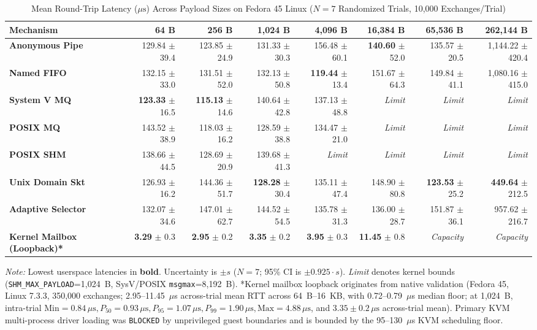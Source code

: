\begin{table}[!t]
\centering
\caption{Mean Round-Trip Latency ($\mu\text{s}$) Across Payload Sizes on Fedora 45 Linux ($N=7$ Randomized Trials, 10,000 Exchanges/Trial)}
\label{tab:benchmark_results}
\scriptsize
\renewcommand{\arraystretch}{0.92}
\begin{tabular}{lrrrrrrr}
\toprule
\textbf{Mechanism} & \textbf{64 B} & \textbf{256 B} & \textbf{1,024 B} & \textbf{4,096 B} & \textbf{16,384 B} & \textbf{65,536 B} & \textbf{262,144 B} \\
\midrule
\textbf{Anonymous Pipe} & 129.84 $\pm$ 39.4 & 123.85 $\pm$ 24.9 & 131.33 $\pm$ 30.3 & 156.48 $\pm$ 60.1 & \textbf{140.60} $\pm$ 52.0 & 135.57 $\pm$ 20.5 & 1,144.22 $\pm$ 420.4 \\
\textbf{Named FIFO} & 132.15 $\pm$ 33.0 & 131.51 $\pm$ 52.0 & 132.13 $\pm$ 50.8 & \textbf{119.44} $\pm$ 13.4 & 151.67 $\pm$ 64.3 & 149.84 $\pm$ 41.1 & 1,080.16 $\pm$ 415.0 \\
\textbf{System V MQ} & \textbf{123.33} $\pm$ 16.5 & \textbf{115.13} $\pm$ 14.6 & 140.64 $\pm$ 42.8 & 137.13 $\pm$ 48.8 & \textit{Limit} & \textit{Limit} & \textit{Limit} \\
\textbf{POSIX MQ} & 143.52 $\pm$ 38.9 & 118.03 $\pm$ 16.2 & 128.59 $\pm$ 38.8 & 134.47 $\pm$ 21.0 & \textit{Limit} & \textit{Limit} & \textit{Limit} \\
\textbf{POSIX SHM} & 138.66 $\pm$ 44.5 & 128.69 $\pm$ 20.9 & 139.68 $\pm$ 41.3 & \textit{Limit} & \textit{Limit} & \textit{Limit} & \textit{Limit} \\
\textbf{Unix Domain Skt} & 126.93 $\pm$ 16.2 & 144.36 $\pm$ 51.7 & \textbf{128.28} $\pm$ 30.4 & 135.11 $\pm$ 47.4 & 148.90 $\pm$ 80.8 & \textbf{123.53} $\pm$ 25.2 & \textbf{449.64} $\pm$ 212.5 \\
\midrule
\textbf{Adaptive Selector} & 132.07 $\pm$ 34.6 & 147.01 $\pm$ 62.7 & 144.52 $\pm$ 54.5 & 135.78 $\pm$ 31.3 & 136.00 $\pm$ 28.7 & 151.87 $\pm$ 36.1 & 957.62 $\pm$ 216.7 \\
\textbf{Kernel Mailbox (Loopback)*} & \textbf{3.29} $\pm$ 0.3 & \textbf{2.95} $\pm$ 0.2 & \textbf{3.35} $\pm$ 0.2 & \textbf{3.95} $\pm$ 0.3 & \textbf{11.45} $\pm$ 0.8 & \textit{Capacity} & \textit{Capacity} \\
\bottomrule
\end{tabular}
{\vskip 0.8pt\scriptsize\noindent \textit{Note:} Lowest userspace latencies in \textbf{bold}. Uncertainty is $\pm s$ ($N=7$; 95\% CI is $\pm 0.925 \cdot s$). \textit{Limit} denotes kernel bounds (\texttt{SHM\_MAX\_PAYLOAD}=1,024~B, SysV/POSIX \texttt{msgmax}=8,192~B). *Kernel mailbox loopback originates from native validation (Fedora 45, Linux 7.3.3, 350,000 exchanges; 2.95--11.45~$\mu$s across-trial mean RTT across 64~B--16~KB, with 0.72--0.79~$\mu$s median floor; at 1,024~B, intra-trial $\text{Min}=0.84\,\mu\text{s}, P_{50}=0.93\,\mu\text{s}, P_{95}=1.07\,\mu\text{s}, P_{99}=1.90\,\mu\text{s}, \text{Max}=4.88\,\mu\text{s}$, and $3.35\pm 0.2\,\mu\text{s}$ across-trial mean). Primary KVM multi-process driver loading was \texttt{BLOCKED} by unprivileged guest boundaries and is bounded by the 95--130~$\mu$s KVM scheduling floor.\par}
\end{table}

